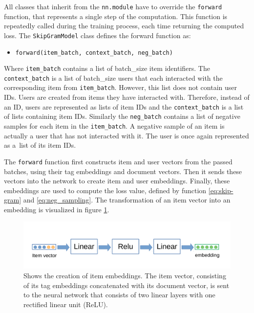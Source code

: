 All classes that inherit from the \texttt{nn.module} have to override the \texttt{forward} function, that represents a single step of the computation. This function is repeatedly called during the training process, each time returning the computed loss. The \texttt{SkipGramModel} class defines the forward function as:
\begin{itemize}
    \item \texttt{forward(item\_batch, context\_batch, neg\_batch)}
\end{itemize}
Where \texttt{item\_batch} contains a list of batch\_size item identifiers. The \texttt{context\_batch} is a list of batch\_size users that each interacted with the corresponding item from \texttt{item\_batch}. However, this list does not contain user IDs. Users are created from items they have interacted with. Therefore, instead of an ID, users are represented as lists of item IDs and the \texttt{context\_batch} is a list of lists containing item IDs. Similarly the \texttt{neg\_batch} contains a list of negative samples for each item in the \texttt{item\_batch}. A negative sample of an item is actually a user that has not interacted with it. The user is once again represented as a~list of its item IDs. 

The \texttt{forward} function first constructs item and user vectors from the passed batches, using their tag embeddings and document vectors. Then it sends these vectors into the network to create item and user embeddings. Finally, these embeddings are used to compute the loss value, defined by function \ref{eq:skip-gram} and \ref{eq:neg_sampling}. The transformation of an item vector into an embedding is visualized in figure \ref{fig:layers}.

\begin{figure}[H]
    \centering
    \includegraphics[scale=0.9]{obrazky-figures/layers.pdf}
    \caption{Shows the creation of item embeddings. The item vector, consisting of its tag embeddings concatenated with its document vector, is sent to the neural network that consists of two linear layers with one rectified linear unit (ReLU).}
    \label{fig:layers}
\end{figure}

